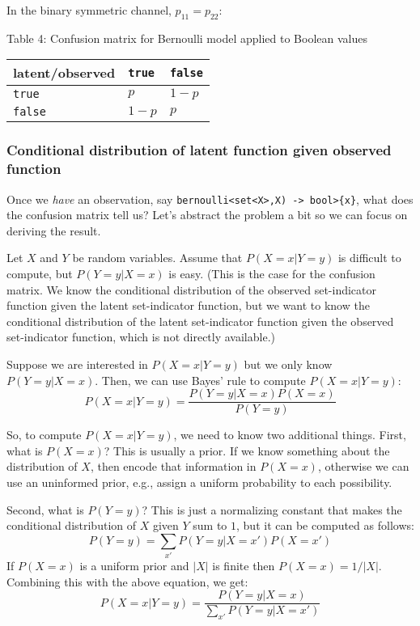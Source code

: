 \documentclass[
]{article}
\begin{document}
In the binary symmetric channel, \(p_{1 1} = p_{2 2}\):

Table 4: Confusion matrix for Bernoulli model applied to Boolean values

\begin{longtable}[]{@{}lll@{}}
\toprule
latent/observed & \texttt{true} & \texttt{false}\tabularnewline
\midrule
\endhead
\texttt{true} & \(p\) & \(1-p\)\tabularnewline
\texttt{false} & \(1-p\) & \(p\)\tabularnewline
\bottomrule
\end{longtable}

\hypertarget{conditional-distribution-of-latent-function-given-observed-function}{%
\subsubsection{Conditional distribution of latent function given
observed
function}\label{conditional-distribution-of-latent-function-given-observed-function}}

Once we \emph{have} an observation, say
\texttt{bernoulli\textless{}set\textless{}X\textgreater{},X)\ -\textgreater{}\ bool\textgreater{}\{x\}},
what does the confusion matrix tell us? Let's abstract the problem a bit
so we can focus on deriving the result.

Let \(X\) and \(Y\) be random variables. Assume that
\(P(X = x | Y = y)\) is difficult to compute, but \(P(Y = y | X = x)\)
is easy. (This is the case for the confusion matrix. We know the
conditional distribution of the observed set-indicator function given
the latent set-indicator function, but we want to know the conditional
distribution of the latent set-indicator function given the observed
set-indicator function, which is not directly available.)

Suppose we are interested in \(P(X = x | Y = y)\) but we only know
\(P(Y = y | X = x)\). Then, we can use Bayes' rule to compute
\(P(X = x | Y = y)\): \[
P(X = x | Y = y) = \frac{P(Y = y | X = x) P(X = x)}{P(Y = y)}
\]

So, to compute \(P(X = x | Y = y)\), we need to know two additional
things. First, what is \(P(X = x)\)? This is usually a prior. If we know
something about the distribution of \(X\), then encode that information
in \(P(X = x)\), otherwise we can use an uninformed prior, e.g., assign
a uniform probability to each possibility.

Second, what is \(P(Y = y)\)? This is just a normalizing constant that
makes the conditional distribution of \(X\) given \(Y\) sum to \(1\),
but it can be computed as follows: \[
P(Y = y) = \sum_{x'} P(Y = y | X = x') P(X = x')
\] If \(P(X = x)\) is a uniform prior and \(|X|\) is finite then
\(P(X = x) = 1/|X|\). Combining this with the above equation, we get: \[
P(X = x | Y = y) = \frac{P(Y = y | X = x)}{\sum_{x'} P(Y = y | X = x')}
\]
\end{document}
